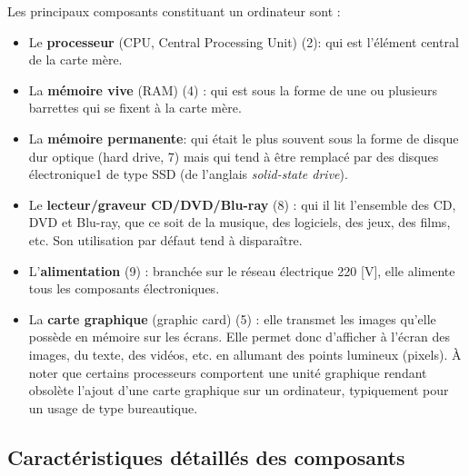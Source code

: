 Les principaux composants constituant un ordinateur sont :
\begin{itemize}%
	\item Le {\bf processeur} (CPU, Central Processing Unit) (2): qui est l'élément central de la carte mère.
	
	\item  La {\bf mémoire vive} (RAM) (4) : qui est sous la forme de une ou plusieurs barrettes qui se fixent à la carte mère.

	\item La {\bf mémoire permanente}: qui était le plus souvent sous la forme de disque dur optique (hard drive, 7) mais qui tend à être remplacé par des disques électronique1 de type SSD (de l'anglais \textit{solid-state drive}).
	
	\item  Le {\bf lecteur/graveur CD/DVD/Blu-ray } (8) : qui il lit l'ensemble des CD, DVD et Blu-ray, que ce soit de la musique, des logiciels, des jeux, des films, etc. Son utilisation par défaut tend à disparaître.
	
	\item L'{\bf alimentation} (9) : branchée sur le réseau électrique 220 [V], elle alimente tous les composants électroniques.
	
	\item La {\bf carte graphique} (graphic card) (5) : elle transmet les images qu'elle possède en mémoire sur les écrans. Elle permet donc d'afficher à l'écran des images, du texte, des vidéos, etc. en allumant des points lumineux (pixels). À noter que certains processeurs comportent une unité graphique rendant obsolète l'ajout d'une carte graphique sur un ordinateur, typiquement pour un usage de type bureautique.
\end{itemize}


\subsection{Caractéristiques détaillés des composants}


